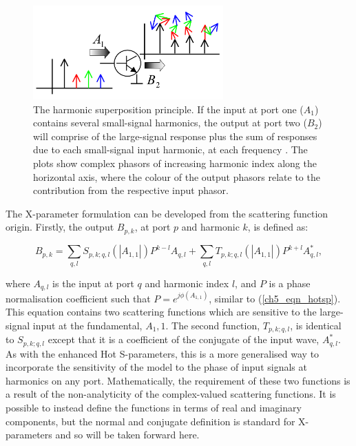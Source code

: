 \documentclass[../thesis/thesis.tex]{subfiles}
\begin{document}
\begin{figure}
	\centering
	\includegraphics[width=0.65\textwidth]{superposition}
	\caption[The harmonic superposition principle.]{The harmonic superposition principle. If the input at port one ($A_1$) contains several small-signal harmonics, the output at port two ($B_2$) will comprise of the large-signal response plus the sum of responses due to each small-signal input harmonic, at each frequency \cite{Verspecht_2006}. The plots show complex phasors of increasing harmonic index along the horizontal axis, where the colour of the output phasors relate to the contribution from the respective input phasor.}
	\label{ch5_fig_superposition}
\end{figure}

The X-parameter formulation can be developed from the scattering function origin. Firstly, the output $B_{p, k}$, at port $p$ and harmonic $k$, is defined as:

\begin{equation}
	B_{p, k} = \sum_{q,l}S_{p, k;q, l}(|A_{1,1}|)P^{k-l}A_{q, l} + 
	\sum_{q,l}T_{p, k;q, l}(|A_{1,1}|)P^{k+l}A_{q, l}^*,
\end{equation}

where $A_{q,l}$ is the input at port $q$ and harmonic index $l$, and $P$ is a phase normalisation coefficient such that $P=e^{j\phi(A_{1,1})}$, similar to (\ref{ch5_eqn_hotsp}). This equation contains two scattering functions which are sensitive to the large-signal input at the fundamental, $A_1,1$. The second function, $T_{p, k;q, l}$, is identical to $S_{p, k;q, l}$ except that it is a coefficient of the conjugate of the input wave, $A_{q, l}^*$. As with the enhanced Hot S-parameters, this is a more generalised way to incorporate the sensitivity of the model to the phase of input signals at harmonics on any port. Mathematically, the requirement of these two functions is a result of the non-analyticity of the complex-valued scattering functions. It is possible to instead define the functions in terms of real and imaginary components, but the normal and conjugate definition is standard for X-parameters and so will be taken forward here.
\end{document}
